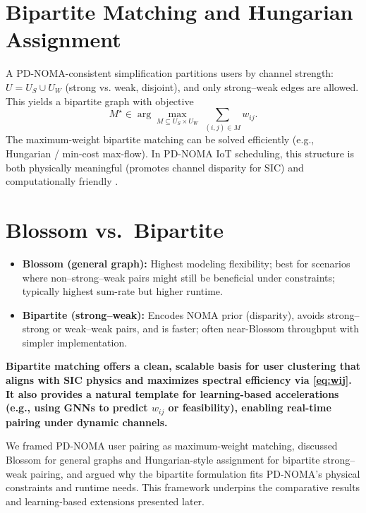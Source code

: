 \section*{Bipartite Matching and Hungarian Assignment}
A PD\mbox{-}NOMA-consistent simplification partitions users by channel strength: $U=U_S\cup U_W$ (strong vs. weak, disjoint), and only strong–weak edges are allowed. This yields a bipartite graph with objective
\begin{equation}
\label{eq:bipartite}
M^\star \in \arg\max_{M \subseteq U_S\times U_W} \ \sum_{(i,j)\in M} w_{ij}.
\end{equation}
The maximum-weight bipartite matching can be solved efficiently (e.g., Hungarian / min-cost max-flow). In PD\mbox{-}NOMA IoT scheduling, this structure is both physically meaningful (promotes channel disparity for SIC) and computationally friendly \cite{mishra2022vtc,mishra2023globecom}.

\section*{Blossom vs.\ Bipartite}
\begin{itemize}
  \item \textbf{Blossom (general graph):} Highest modeling flexibility; best for scenarios where non–strong–weak pairs might still be beneficial under constraints; typically highest sum-rate but higher runtime.
  \item \textbf{Bipartite (strong–weak):} Encodes NOMA prior (disparity), avoids strong–strong or weak–weak pairs, and is faster; often near-Blossom throughput with simpler implementation.
\end{itemize}

\vspace{0.5cm}
{\bf{Bipartite matching offers a clean, scalable basis for user clustering that aligns with SIC physics and maximizes spectral efficiency via \eqref{eq:wij}. It also provides a natural template for learning-based accelerations (e.g., using GNNs to predict $w_{ij}$ or feasibility), enabling real-time pairing under dynamic channels.}}


We framed PD\mbox{-}NOMA user pairing as maximum-weight matching, discussed Blossom for general graphs and Hungarian-style assignment for bipartite strong–weak pairing, and argued why the bipartite formulation fits PD\mbox{-}NOMA’s physical constraints and runtime needs. This framework underpins the comparative results and learning-based extensions presented later.
